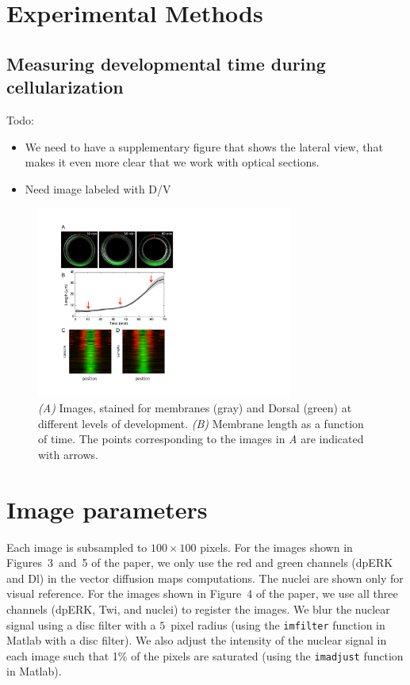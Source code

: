 \documentclass[12pt]{article}
\begin{document}
\section{Experimental Methods}

\subsection{Measuring developmental time during cellularization}

Todo:
\begin{itemize}
\item We need to have a supplementary figure that shows the lateral view, that makes it even more clear that we work with optical sections.

\item Need image labeled with D/V

\end{itemize}

\begin{figure}[h!]
\includegraphics[width=8.4cm, trim=0cm 5.6cm 0cm 0cm, clip]{fig6}
\caption{{\it (A)} Images, stained for membranes (gray) and Dorsal (green) at different levels of development. {\it (B)} Membrane length as a function of time. The points corresponding to the images in {\it A} are indicated with arrows.}
\label{fig:membrane_compare}
\end{figure}

\section{Image parameters}

Each image is subsampled to $100 \times 100$ pixels.
%
For the images shown in Figures~3~and~5 of the paper, we only use the red and green channels (dpERK and Dl) in the vector diffusion maps computations.
%
The nuclei are shown only for visual reference.
%
For the images shown in Figure~4 of the paper, we use all three channels (dpERK, Twi, and nuclei) to register the images.
%
We blur the nuclear signal using a disc filter with a $5$~pixel radius (using the \texttt{imfilter} function in Matlab with a disc filter).
%
We also adjust the intensity of the nuclear signal in each image such that 1\% of the pixels are saturated (using the \texttt{imadjust} function in Matlab).
\end{document}
